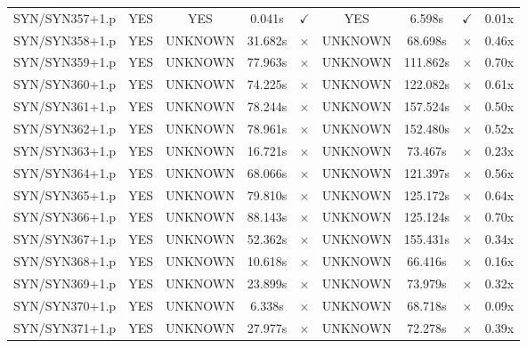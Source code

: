 \documentclass[a4paper,10pt]{article}
\begin{document}
\begin{longtable}{lcccccccc}
SYN/SYN357+1.p & YES & YES & 0.041s & \cellcolor{matchcolor}$\checkmark$ & YES & 6.598s & \cellcolor{matchcolor}$\checkmark$ & 0.01x \\
SYN/SYN358+1.p & YES & UNKNOWN & 31.682s & \cellcolor{mismatchcolor}$\times$ & UNKNOWN & 68.698s & \cellcolor{mismatchcolor}$\times$ & 0.46x \\
SYN/SYN359+1.p & YES & UNKNOWN & 77.963s & \cellcolor{mismatchcolor}$\times$ & UNKNOWN & 111.862s & \cellcolor{mismatchcolor}$\times$ & 0.70x \\
SYN/SYN360+1.p & YES & UNKNOWN & 74.225s & \cellcolor{mismatchcolor}$\times$ & UNKNOWN & 122.082s & \cellcolor{mismatchcolor}$\times$ & 0.61x \\
SYN/SYN361+1.p & YES & UNKNOWN & 78.244s & \cellcolor{mismatchcolor}$\times$ & UNKNOWN & 157.524s & \cellcolor{mismatchcolor}$\times$ & 0.50x \\
SYN/SYN362+1.p & YES & UNKNOWN & 78.961s & \cellcolor{mismatchcolor}$\times$ & UNKNOWN & 152.480s & \cellcolor{mismatchcolor}$\times$ & 0.52x \\
SYN/SYN363+1.p & YES & UNKNOWN & 16.721s & \cellcolor{mismatchcolor}$\times$ & UNKNOWN & 73.467s & \cellcolor{mismatchcolor}$\times$ & 0.23x \\
SYN/SYN364+1.p & YES & UNKNOWN & 68.066s & \cellcolor{mismatchcolor}$\times$ & UNKNOWN & 121.397s & \cellcolor{mismatchcolor}$\times$ & 0.56x \\
SYN/SYN365+1.p & YES & UNKNOWN & 79.810s & \cellcolor{mismatchcolor}$\times$ & UNKNOWN & 125.172s & \cellcolor{mismatchcolor}$\times$ & 0.64x \\
SYN/SYN366+1.p & YES & UNKNOWN & 88.143s & \cellcolor{mismatchcolor}$\times$ & UNKNOWN & 125.124s & \cellcolor{mismatchcolor}$\times$ & 0.70x \\
SYN/SYN367+1.p & YES & UNKNOWN & 52.362s & \cellcolor{mismatchcolor}$\times$ & UNKNOWN & 155.431s & \cellcolor{mismatchcolor}$\times$ & 0.34x \\
SYN/SYN368+1.p & YES & UNKNOWN & 10.618s & \cellcolor{mismatchcolor}$\times$ & UNKNOWN & 66.416s & \cellcolor{mismatchcolor}$\times$ & 0.16x \\
SYN/SYN369+1.p & YES & UNKNOWN & 23.899s & \cellcolor{mismatchcolor}$\times$ & UNKNOWN & 73.979s & \cellcolor{mismatchcolor}$\times$ & 0.32x \\
SYN/SYN370+1.p & YES & UNKNOWN & 6.338s & \cellcolor{mismatchcolor}$\times$ & UNKNOWN & 68.718s & \cellcolor{mismatchcolor}$\times$ & 0.09x \\
SYN/SYN371+1.p & YES & UNKNOWN & 27.977s & \cellcolor{mismatchcolor}$\times$ & UNKNOWN & 72.278s & \cellcolor{mismatchcolor}$\times$ & 0.39x \\

\end{longtable}
\end{document}
